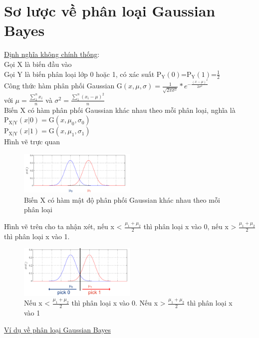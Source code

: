 \documentclass[a4paper, 13pt]{report}
\begin{document}
\section{Sơ lược về phân loại Gaussian Bayes}
\underline{Định nghĩa không chính thống}:\\
Gọi X là biến đầu vào\\
Gọi Y là biến phân loại lớp 0 hoặc 1, có xác suất $\mathrm{P_Y}(0)$=$\mathrm{P_Y}(1)$=$\frac{1}{2}$\\
Công thức hàm phân phối Gaussian 
$
\mathrm{G}(x,\mu,\sigma)=\frac{1}{\sqrt{2\pi\sigma^2}} * e^{-\frac{(x-\mu)^2}{2\sigma^2}}  
$\\
với $\mu=\frac{\sum_1^n x_i}{n}$ và $\sigma^2=\frac{\sum_1^n (x_i-\mu)^2}{n}$\\
Biến X có hàm phân phối Gaussian khác nhau theo mỗi phân loại, nghĩa là \\
$\mathrm{P_{X|Y}}(x|0)=\mathrm{G}(x,\mu_0,\sigma_0)$\\
$\mathrm{P_{X|Y}}(x|1)=\mathrm{G}(x,\mu_1,\sigma_1)$\\
Hình vẽ trực quan\\  
\FloatBarrier
\begin{figure}[h]
  \centering
    \includegraphics[width=0.5\textwidth]{GaussBayesEx.png}    
    \caption{Biến X có hàm mật độ phân phối Gaussian khác nhau theo mỗi phân loại}
\end{figure}
\FloatBarrier 
Hình vẽ trên cho ta nhận xét, nếu x < $\frac{\mu_1+\mu_2}{2}$ thì phân loại x vào 0, nếu x > $\frac{\mu_1+\mu_2}{2}$ thì phân loại x vào 1.\\  
\FloatBarrier
\begin{figure}[h]
  \centering
    \includegraphics[width=0.5\textwidth]{GaussBayesEx2.png}
	\caption{Nếu x < $\frac{\mu_1+\mu_2}{2}$ thì phân loại x vào 0. Nếu x > $\frac{\mu_1+\mu_2}{2}$ thì phân loại x vào 1}
\end{figure}
\FloatBarrier 
\underline{Ví dụ về phân loại Gaussian Bayes}\\
\end{document}
